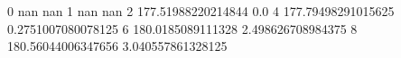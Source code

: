 0 nan nan
1 nan nan
2 177.51988220214844 0.0
4 177.79498291015625 0.2751007080078125
6 180.0185089111328 2.498626708984375
8 180.56044006347656 3.040557861328125
